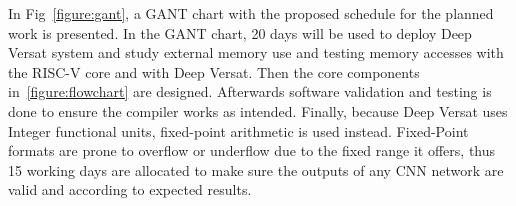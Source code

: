 In Fig~\ref{figure:gant}, a GANT chart with the proposed schedule for the
planned work is presented. In the GANT chart, 20 days will be used to deploy Deep Versat system and study external memory use and testing
memory accesses with the RISC-V core and with Deep Versat. Then the core components in~\ref{figure:flowchart} are designed. Afterwards
software validation and testing is done to ensure the compiler works as intended. Finally, because Deep Versat uses Integer functional units, fixed-point arithmetic
is used instead. Fixed-Point formats are prone to overflow or underflow due to the fixed range it offers, thus 15 working days are allocated to
make sure the outputs of any CNN network are valid and according to expected results. 






